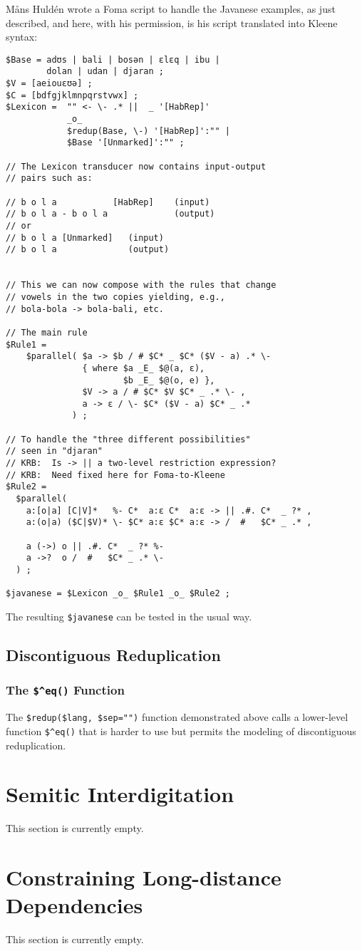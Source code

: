 M\r{a}ns Huldén wrote a Foma script to handle the Javanese examples, as
just described, and here, with his permission, is his script translated into Kleene syntax:

\begin{Verbatim}
$Base = adʊs | bali | bosən | ɛlɛq | ibu | 
        dolan | udan | djaran ;
$V = [aeiouɛʊə] ;
$C = [bdfgjklmnpqrstvwx] ;
$Lexicon =  "" <- \- .* ||  _ '[HabRep]'
            _o_
            $redup(Base, \-) '[HabRep]':"" | 
			$Base '[Unmarked]':"" ;

// The Lexicon transducer now contains input-output
// pairs such as:

// b o l a           [HabRep]    (input)     
// b o l a - b o l a             (output)         
// or
// b o l a [Unmarked]   (input)
// b o l a              (output)


// This we can now compose with the rules that change
// vowels in the two copies yielding, e.g., 
// bola-bola -> bola-bali, etc.

// The main rule
$Rule1 =  
    $parallel( $a -> $b / # $C* _ $C* ($V - a) .* \-
               { where $a _E_ $@(a, ɛ), 
                       $b _E_ $@(o, e) },
               $V -> a / # $C* $V $C* _ .* \- ,
               a -> ɛ / \- $C* ($V - a) $C* _ .*
             ) ;

// To handle the "three different possibilities" 
// seen in "djaran"
// KRB:  Is -> || a two-level restriction expression?
// KRB:  Need fixed here for Foma-to-Kleene
$Rule2 =  
  $parallel(
    a:[o|a] [C|V]*   %- C*  a:ɛ C*  a:ɛ -> || .#. C*  _ ?* ,
    a:(o|a) ($C|$V)* \- $C* a:ɛ $C* a:ɛ -> /  #   $C* _ .* ,

    a (->) o || .#. C*  _ ?* %- 
    a ->?  o /  #   $C* _ .* \-
  ) ;

$javanese = $Lexicon _o_ $Rule1 _o_ $Rule2 ;
\end{Verbatim}

\noindent
The resulting \verb!$javanese! \fst{} can be tested in the usual way.

\subsection{Discontiguous Reduplication}

\cprotect\subsubsection{The \verb!$^eq()! Function}

The \verb!$redup($lang, $sep="")! function demonstrated above calls a lower-level
function \verb!$^eq()! that is harder to use but permits the modeling of
discontiguous reduplication.


\section{Semitic Interdigitation}

This section is currently empty.

\section{Constraining Long-distance Dependencies}

This section is currently empty.
